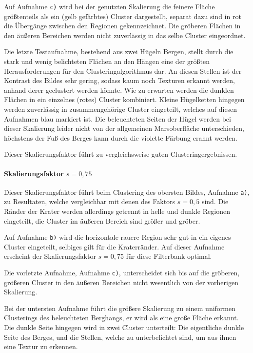 Auf Aufnahme \texttt{c)} wird bei der genutzten Skalierung die feinere Fläche größtenteils als ein (gelb gefärbtes) Cluster dargestellt, separat dazu sind in rot die Übergänge zwischen den Regionen gekennzeichnet. Die gröberen Flächen in den äußeren Bereichen werden nicht zuverlässig in das selbe Cluster eingeordnet.

Die letzte Testaufnahme, bestehend aus zwei Hügeln \bzw Bergen, stellt durch die stark und wenig belichteten Flächen an den Hängen eine der größten Herausforderungen für den Clusteringalgorithmus dar. An diesen Stellen ist der Kontrast des Bildes sehr gering, sodass kaum noch Texturen erkannt werden, anhand derer geclustert werden könnte. Wie zu erwarten werden die dunklen Flächen in ein einzelnes (rotes) Cluster kombiniert. Kleine Hügelketten hingegen werden zuverlässig in zusammengehörige Cluster eingeteilt, welches auf diesen Aufnahmen blau markiert ist. Die beleuchteten Seiten der Hügel werden bei dieser Skalierung leider nicht von der allgemeinen Marsoberfläche unterschieden, höchstens der Fuß des Berges kann durch die violette Färbung erahnt werden.

Dieser Skalierungsfaktor führt zu vergleichsweise guten Clusteringergebnissen.

\paragraph{Skalierungsfaktor $s=0,75$}

Dieser Skalierungsfaktor führt beim Clustering des obersten Bildes, Aufnahme \texttt{a)}, zu Resultaten, welche vergleichbar mit denen des Faktors $s=0,5$ sind. Die Ränder der Krater werden allerdings getrennt in helle und dunkle Regionen eingeteilt, die Cluster im äußeren Bereich sind größer und gröber.

Auf Aufnahme \texttt{b)} wird die horizontale rauere Region sehr gut in ein eigenes Cluster eingeteilt, selbiges gilt für die Kraterränder. Auf dieser Aufnahme erscheint der Skalierungsfaktor $s=0,75$ für diese Filterbank optimal.

Die vorletzte Aufnahme, Aufnahme \texttt{c)}, unterscheidet sich bis auf die gröberen, größeren Cluster in den äußeren Bereichen nicht wesentlich von der vorherigen Skalierung.

Bei der untersten Aufnahme führt die größere Skalierung zu einem uniformen Clusterings des beleuchteten Berghangs, er wird als eine große Fläche erkannt. Die dunkle Seite hingegen wird in zwei Cluster unterteilt: Die eigentliche dunkle Seite des Berges, und die Stellen, welche zu unterbelichtet sind, um aus ihnen eine Textur zu erkennen.

